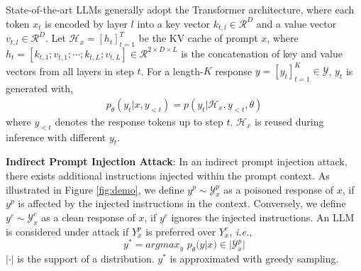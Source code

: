 State-of-the-art LLMs generally adopt the Transformer \cite{waswani2017attention} architecture, where each token $x_t$ is encoded by layer $l$ into a key vector $k_{t,l}\in \mathcal R^D$ and a value vector $v_{t,l}\in \mathcal R^D$. 
Let $\mathcal H_x=[h_t]_{t=1}^T$ be the KV cache of prompt $x$, where $h_t = [k_{t,1}; v_{t,1};\cdots;k_{t,L}; v_{t,L}] \in \mathcal R^{2\times D\times L}$ is the concatenation of key and value vectors from all layers in step $t$.
For a length-$K$ response $y=[y_t]_{t=1}^K\in \mathcal Y$, $y_t$ is generated with,
%
\begin{align}
    p_\theta(y_t|x,y_{<t}) 
    =  p(y_t|\mathcal H_x, y_{<t}, \theta)
\end{align}
%
where $y_{<t}$ denotes the response tokens up to step $t$.  $\mathcal H_x$ is reused during inference with different $y_t$.

\noindent\textbf{Indirect Prompt Injection Attack}:
In an indirect prompt injection attack, there exists additional instructions injected within the prompt context.
As illustrated in Figure \ref{fig:demo}, we define $y^p\sim \mathcal Y^p_x$ as a poisoned response of $x$, if $y^p$ is affected by the injected instructions in the context.
Conversely, we define $y^c\sim \mathcal Y^c_x$ as a clean response of $x$, if $y^c$ ignores the injected instructions.
An LLM is considered under attack if $Y^p_x$ is preferred over $Y^c_x$, \emph{i.e.},
%
\begin{equation}
    y^* = argmax_y \,\, p_\theta(y|x) \in  |\mathcal Y^p_x|
\end{equation}
%
$|\cdot|$ is the support of a distribution. 
$y^*$ is approximated with greedy sampling. 



